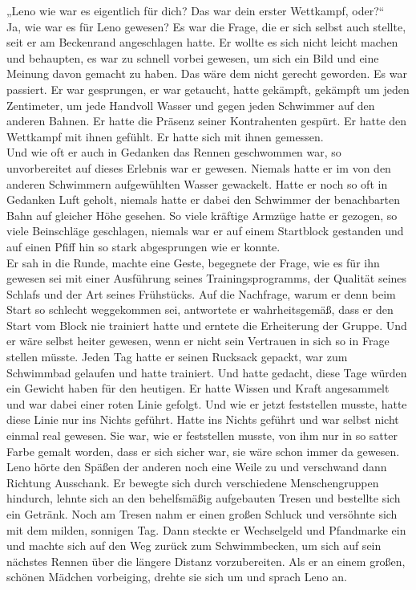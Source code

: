 \documentclass[ngerman,smalldemyvopaper,11pt,oneside,onecolumn,openright,extrafontsizes]{memoir}
\begin{document}
„Leno wie war es eigentlich für dich? Das war dein erster Wettkampf, oder?“\\
Ja, wie war es für Leno gewesen? Es war die Frage, die er sich selbst auch stellte, seit er am Beckenrand angeschlagen hatte. Er wollte es sich nicht leicht machen und behaupten, es war zu schnell vorbei gewesen, um sich ein Bild und eine Meinung davon gemacht zu haben. Das wäre dem nicht gerecht geworden. Es war passiert. Er war gesprungen, er war getaucht, hatte gekämpft, gekämpft um jeden Zentimeter, um jede Handvoll Wasser und gegen jeden Schwimmer auf den anderen Bahnen. Er hatte die Präsenz seiner Kontrahenten gespürt. Er hatte den Wettkampf mit ihnen gefühlt. Er hatte sich mit ihnen gemessen.\\
Und wie oft er auch in Gedanken das Rennen geschwommen war, so unvorbereitet auf dieses Erlebnis war er gewesen. Niemals hatte er im von den anderen Schwimmern aufgewühlten Wasser gewackelt. Hatte er noch so oft in Gedanken Luft geholt, niemals hatte er dabei den Schwimmer der benachbarten Bahn auf gleicher Höhe gesehen. So viele kräftige Armzüge hatte er gezogen, so viele Beinschläge geschlagen, niemals war er auf einem Startblock gestanden und auf einen Pfiff hin so stark abgesprungen wie er konnte.\\
Er sah in die Runde, machte eine Geste, begegnete der Frage, wie es für ihn gewesen sei mit einer Ausführung seines Trainingsprogramms, der Qualität seines Schlafs und der Art seines Frühstücks. Auf die Nachfrage, warum er denn beim Start so schlecht weggekommen sei, antwortete er wahrheitsgemäß, dass er den Start vom Block nie trainiert hatte und erntete die Erheiterung der Gruppe. Und er wäre selbst heiter gewesen, wenn er nicht sein Vertrauen in sich so in Frage stellen müsste. Jeden Tag hatte er seinen Rucksack gepackt, war zum Schwimmbad gelaufen und hatte trainiert. Und hatte gedacht, diese Tage würden ein Gewicht haben für den heutigen. Er hatte Wissen und Kraft angesammelt und war dabei einer roten Linie gefolgt. Und wie er jetzt feststellen musste, hatte diese Linie nur ins Nichts geführt. Hatte ins Nichts geführt und war selbst nicht einmal real gewesen. Sie war, wie er feststellen musste, von ihm nur in so satter Farbe gemalt worden, dass er sich sicher war, sie wäre schon immer da gewesen.\\
Leno hörte den Späßen der anderen noch eine Weile zu und verschwand dann Richtung Ausschank. Er bewegte sich durch verschiedene Menschengruppen hindurch, lehnte sich an den behelfsmäßig aufgebauten Tresen und bestellte sich ein Getränk. Noch am Tresen nahm er einen großen Schluck und versöhnte sich mit dem milden, sonnigen Tag. Dann steckte er Wechselgeld und Pfandmarke ein und machte sich auf den Weg zurück zum Schwimmbecken, um sich auf sein nächstes Rennen über die längere Distanz vorzubereiten. Als er an einem großen, schönen Mädchen vorbeiging, drehte sie sich um und sprach Leno an.\\
\end{document}
